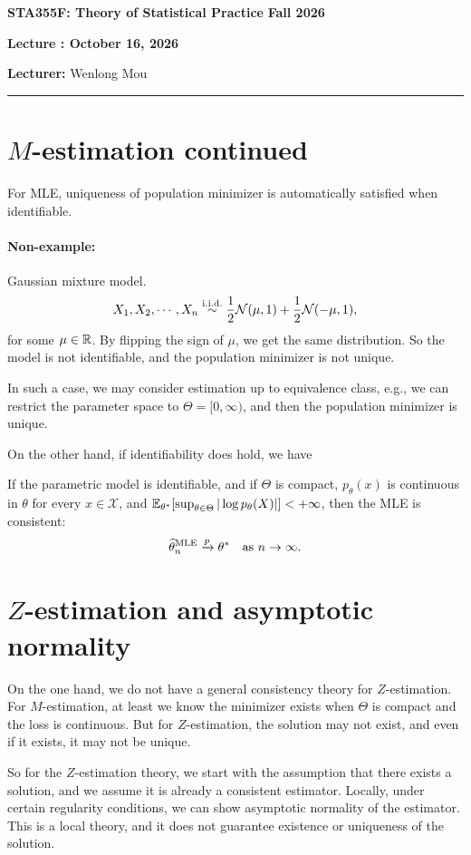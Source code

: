 \documentclass[11pt,letterpaper]{article}
\newcommand{\coursenumber}{STA355F}
\newcommand{\coursetitle}{Theory of Statistical Practice}
\newcommand{\courseterm}{Fall 2026}
\newcounter{lecture}
\newcommand{\lecturenumber}{\arabic{lecture}}
\newcommand{\lecturedate}{October 16, 2026}
\newcommand{\lecturer}{Wenlong Mou}
\numberwithin{assumption}{lecture}
\numberwithin{theorem}{lecture}
\numberwithin{proposition}{lecture}
\numberwithin{lemma}{lecture}
\numberwithin{claim}{lecture}
\numberwithin{corollary}{lecture}
\numberwithin{definition}{lecture}
\numberwithin{conjecture}{lecture}
\numberwithin{remark}{lecture}
\numberwithin{example}{lecture}
\numberwithin{equation}{lecture}
\newcommand{\makelecturenotesheader}{%
  \noindent
  \textbf{\coursenumber: \coursetitle}%
  \hfill
  \textbf{\courseterm}

  \begin{center}
    {\Large\bfseries Lecture \lecturenumber: \lecturedate}
  \end{center}

  \noindent
  \textbf{Lecturer:} \lecturer
  \par\medskip
  \hrule
  \bigskip
}
\begin{document}
\makelecturenotesheader

\section{$M$-estimation continued}
For MLE, uniqueness of population minimizer is automatically satisfied when identifiable.

\paragraph{Non-example:} Gaussian mixture model.
\begin{align*}
  X_1, X_2, \cdots, X_n \overset{\mathrm{i.i.d.}}{\sim} \frac{1}{2} \mathcal{N} (\mu, 1) + \frac{1}{2} \mathcal{N} (- \mu, 1),
\end{align*}
for some $\mu \in \mathbb{R}$. By flipping the sign of $\mu$, we get the same distribution. So the model is not identifiable, and the population minimizer is not unique.

In such a case, we may consider estimation up to equivalence class, e.g., we can restrict the parameter space to $\Theta = [0, \infty)$, and then the population minimizer is unique.

On the other hand, if identifiability does hold, we have
\begin{corollary}
  If the parametric model is identifiable, and if $\Theta$ is compact, $p_\theta (x)$ is continuous in $\theta$ for every $x \in \mathcal{X}$, and ${\mathbb{E}}_{\theta^*} [\sup_{\theta \in \Theta} |\log p_\theta (X)|] < + \infty$, then the MLE is consistent:
  \begin{align*}
    \widehat{\theta}_n^{\mathrm{MLE}} \xrightarrow{p} \theta^* \quad \text{as } n \to \infty.
  \end{align*}
\end{corollary}

\section{$Z$-estimation and asymptotic normality}
On the one hand, we do not have a general consistency theory for $Z$-estimation. For $M$-estimation, at least we know the minimizer exists when $\Theta$ is compact and the loss is continuous. But for $Z$-estimation, the solution may not exist, and even if it exists, it may not be unique.

So for the $Z$-estimation theory, we start with the assumption that there exists a solution, and we assume it is already a consistent estimator. Locally, under certain regularity conditions, we can show asymptotic normality of the estimator. This is a local theory, and it does not guarantee existence or uniqueness of the solution.
\end{document}
